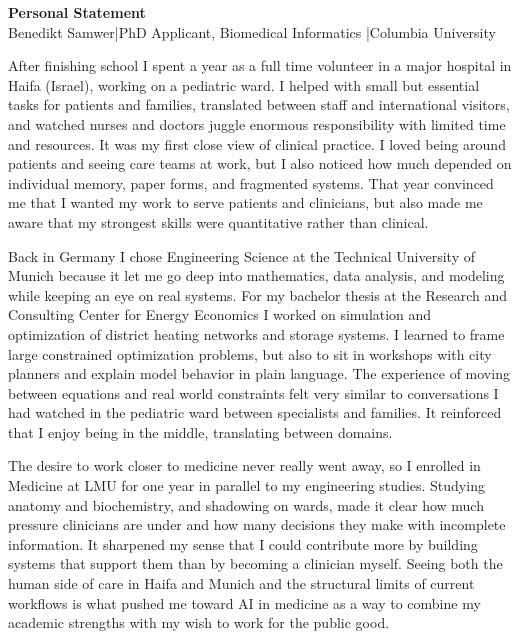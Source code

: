 \documentclass[11pt,a4paper]{article}
\begin{document}

\begin{center}
\Large\textbf{Personal Statement}\\[4pt]
\normalsize Benedikt Samwer\quad|\quad PhD Applicant, Biomedical Informatics \quad|\quad Columbia University
\end{center}

After finishing school I spent a year as a full time volunteer in a major hospital in Haifa (Israel), working on a pediatric ward. I helped with small but essential tasks for patients and families, translated between staff and international visitors, and watched nurses and doctors juggle enormous responsibility with limited time and resources. It was my first close view of clinical practice. I loved being around patients and seeing care teams at work, but I also noticed how much depended on individual memory, paper forms, and fragmented systems. That year convinced me that I wanted my work to serve patients and clinicians, but also made me aware that my strongest skills were quantitative rather than clinical.

Back in Germany I chose Engineering Science at the Technical University of Munich because it let me go deep into mathematics, data analysis, and modeling while keeping an eye on real systems. For my bachelor thesis at the Research and Consulting Center for Energy Economics I worked on simulation and optimization of district heating networks and storage systems. I learned to frame large constrained optimization problems, but also to sit in workshops with city planners and explain model behavior in plain language. The experience of moving between equations and real world constraints felt very similar to conversations I had watched in the pediatric ward between specialists and families. It reinforced that I enjoy being in the middle, translating between domains.

The desire to work closer to medicine never really went away, so I enrolled in Medicine at LMU for one year in parallel to my engineering studies. Studying anatomy and biochemistry, and shadowing on wards, made it clear how much pressure clinicians are under and how many decisions they make with incomplete information. It sharpened my sense that I could contribute more by building systems that support them than by becoming a clinician myself. Seeing both the human side of care in Haifa and Munich and the structural limits of current workflows is what pushed me toward AI in medicine as a way to combine my academic strengths with my wish to work for the public good.
\end{document}
